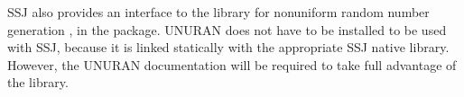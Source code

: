 SSJ also provides an interface to the
library for nonuniform random number generation \cite{iLEY02a}, in the
 package.
UNURAN does not have to be installed to be used with SSJ, because it is
linked statically with the appropriate SSJ native library.
However, the UNURAN documentation will be required
to take full advantage of the library.
